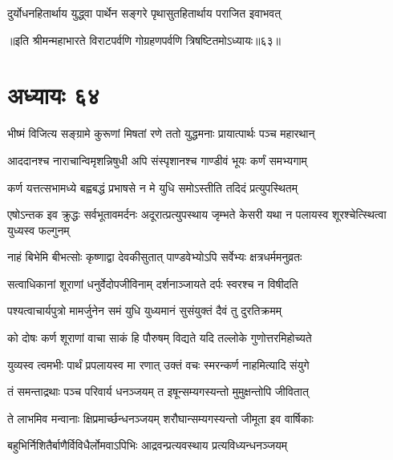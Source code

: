 \twolineshloka
{दुर्योधनहितार्थाय युद्ध्वा पार्थेन सङ्गरे}
{पृथासुतहितार्थाय पराजित इवाभवत्}

॥इति श्रीमन्महाभारते विराटपर्वणि गोग्रहणपर्वणि त्रिषष्टितमोऽध्यायः॥६३॥

\chapter{अध्यायः ६४}

\twolineshloka
{भीष्मं विजित्य सङ्ग्रामे कुरूणां मिषतां रणे}
{ततो युद्धमनाः प्रायात्पार्थः पञ्च महारथान्}


\twolineshloka
{आददानश्च नाराचान्विमृशन्निषुधी अपि}
{संस्पृशानश्च गाण्डीवं भूयः कर्णं समभ्यगाम्}




\twolineshloka
{कर्ण यत्तत्सभामध्ये बह्वबद्धं प्रभाषसे}
{न मे युधि समोऽस्तीति तदिदं प्रत्युपस्थितम्}


\threelineshloka
{एषोऽन्तक इव क्रुद्धः सर्वभूतावमर्दनः}
{अदूरात्प्रत्युपस्थाय जृम्भते केसरी यथा}
{न पलायस्व शूरश्चेत्स्थित्वा युध्यस्व फल्गुनम्}




\twolineshloka
{नाहं बिभेमि बीभत्सोः कृष्णाद्वा देवकीसुतात्}
{पाण्डवेभ्योऽपि सर्वेभ्यः क्षत्रधर्ममनुव्रतः}


\twolineshloka
{सत्वाधिकानां शूराणां धनुर्वेदोपजीविनाम्}
{दर्शनाञ्जायते दर्पः स्वरश्च न विषीदति}


\twolineshloka
{पश्यत्वाचार्यपुत्रो मामर्जुनेन समं युधि}
{युध्यमानं सुसंयुक्तं दैवं तु दुरतिक्रमम्}




\twolineshloka
{को दोषः कर्ण शूराणां वाचा साकं हि पौरुषम्}
{विद्यते यदि तल्लोके गुणोत्तरमिहोच्यते}


\twolineshloka
{युव्यस्व त्वमभीः पार्थं प्रपलायस्व मा रणात्}
{उक्तं वचः स्मरन्कर्ण नाहमित्यादि संयुगे}



\twolineshloka
{तं समन्ताद्रथाः पञ्च परिवार्य धनञ्जयम्}
{त इषून्सम्यगस्यन्तो मुमुक्षन्तोपि जीवितात्}


\twolineshloka
{ते लाभमिव मन्वानाः क्षिप्रमार्च्छन्धनञ्जयम्}
{शरौघान्सम्यगस्यन्तो जीमूता इव वार्षिकाः}


\twolineshloka
{बहुभिर्निशितैर्बाणैर्विविधैर्लोमवाऽपिभिः}
{आद्रवन्प्रत्यवस्थाय प्रत्यविध्यन्धनञ्जयम्}


